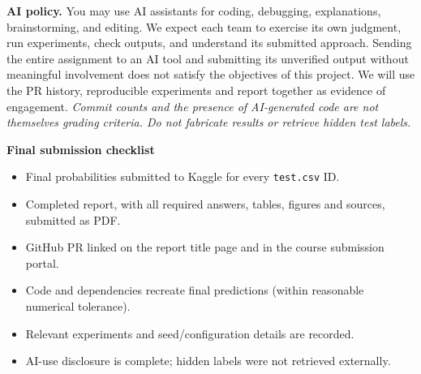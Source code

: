 \documentclass[11pt,letterpaper]{article}
\begin{document}
\vspace{12pt}
\textbf{AI policy.} You may use AI assistants for coding, debugging, explanations, brainstorming, and editing. We expect each team to exercise its own judgment, run experiments, check outputs, and understand its submitted approach. Sending the entire assignment to an AI tool and submitting its unverified output without meaningful involvement does not satisfy the objectives of this project. We will use the PR history, reproducible experiments and report together as evidence of engagement. \textit{Commit counts and the presence of AI-generated code are not themselves grading criteria. Do not fabricate results or retrieve hidden test labels.}

\vspace{18pt}
{\large\textbf{Final submission checklist}}
\vspace{6pt}

\begin{itemize}[leftmargin=*,label=$\square$,itemsep=4pt]
    \item Final probabilities submitted to Kaggle for every \texttt{test.csv} ID.
    \item Completed report, with all required answers, tables, figures and sources, submitted as PDF.
    \item GitHub PR linked on the report title page and in the course submission portal.
    \item Code and dependencies recreate final predictions (within reasonable numerical tolerance).
    \item Relevant experiments and seed/configuration details are recorded.
    \item AI-use disclosure is complete; hidden labels were not retrieved externally.
\end{itemize}
\end{document}

